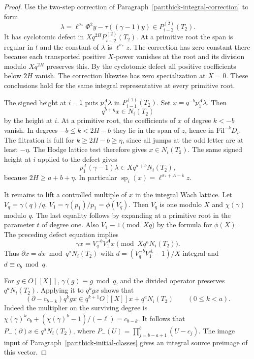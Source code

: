 \begin{proof}

Use the two-step correction
of Paragraph~\ref{par:thick-integral-correction} to form
\[
 \lambda=\ell^{\sigma_*}\Phi^2 y-
                      \tau((\gamma-1)y)\in P_{i-2}^{(2)}(T_2).
\]
It has cyclotomic defect in \(Xq^{2H}P_{i-2}^{(2)}(T_2)\).
At a primitive root the span is regular in \(t\) and the
constant of \(\lambda\) is \(\ell^{\sigma_*}z\).
The correction has zero constant there because each transported
positive \(X\)-power vanishes at the root and its division modulo
\(Xq^{2H}\) preserves this. By the cyclotomic defect all
positive coefficients below \(2H\) vanish. The correction
likewise has zero specialization at \(X=0\).
These conclusions hold for the same integral representative
at every primitive root.

The signed height at \(i-1\) puts \(p_1^A\lambda\) in
\(P_{i-1}^{(1)}(T_2)\). Set \(x=q^{-b}p_1^A\lambda\).
Then
\[
 q^{b+\eta}x\in N_i(T_2)
\]
by the height at \(i\).
At a primitive root, the coefficients of \(x\) of degree
\(k<-b\) vanish. In degrees \(-b\le k<2H-b\) they lie
in the span of \(z\), hence in \(\mathrm{Fil}^{-k}D_i\).
The filtration is full for \(k\ge 2H-b\ge\eta\), since
all jumps at the odd letter are at least \(-\eta\).
The Hodge lattice test therefore gives \(x\in N_i(T_2)\).
The same signed height at \(i\) applied to the defect
gives
\[
           p_1^A(\gamma-1)\lambda\in Xq^{a+b}N_i(T_2),
\]
because \(2H\ge a+b+\eta\).
In particular
\(\operatorname{sp}_i(x)=\ell^{\sigma_*+A-b}z\).

It remains to lift a controlled multiple of \(x\) in the
integral Wach lattice. Let \(V_q=\gamma(q)/q\),
\(V_1=\gamma(p_1)/p_1=\phi(V_q)\).
Then \(V_q\) is one modulo \(X\) and \(\chi(\gamma)\) modulo \(q\).
The last equality follows by expanding at a primitive root
in the parameter \(t\) of degree one. Also
\(V_1\equiv1\pmod{Xq}\) by the formula for \(\phi(X)\).
The preceding defect equation implies
\[
 \gamma x=V_q^{-b}V_1^A x
                    \pmod{Xq^aN_i(T_2)}.
\]
Thus \(\partial x=d x\bmod q^aN_i(T_2)\) with
\(d=(V_q^{-b}V_1^A-1)/X\) integral and \(d\equiv c_b\bmod q\).

For \(g\in O[[X]]\), \(\gamma(g)\equiv g\bmod q\), and
the divided operator preserves \(q^aN_i(T_2)\).
Applying it to \(q^k g x\) shows that
\[
    (\partial-c_{b-k})q^k g x
           \in q^{k+1}O[[X]]x+q^aN_i(T_2)\qquad(0\le k<a).
\]
Indeed the multiplier on the surviving degree is
\(\chi(\gamma)^k c_b+(\chi(\gamma)^k-1)/(-\ell)=c_{b-k}\).
It follows that \(P_-(\partial)x\in q^aN_i(T_2)\), where
\(P_-(U)=\prod_{j=b-a+1}^{b}(U-c_j)\).
The image input of Paragraph~\ref{par:thick-initial-classes}
gives an integral source preimage of this vector.


\end{proof}

